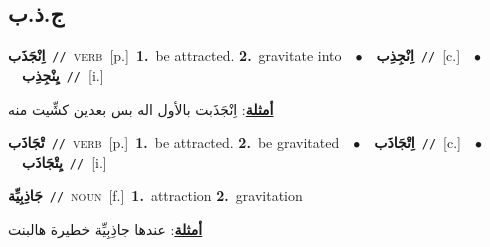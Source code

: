 \documentclass[10pt,a4paper,twoside]{article} %
\begin{document}
\begin{multicols}{2}
\vspace{-3mm}
\subsection*{\color{blue}\foreignlanguage{arabic}{ج.ذ.ب}\color{blue}{}} 

{\setlength\topsep{0pt}\textbf{\foreignlanguage{arabic}{اِنْجَذَب}}\ {\color{gray}\texttt{//}\color{black}}\ \textsc{verb}\ [p.]\ \textbf{1.}~be attracted.  \textbf{2.}~gravitate into\ \ $\bullet$\ \ \setlength\topsep{0pt}\textbf{\foreignlanguage{arabic}{اِنْجِذِب}}\ {\color{gray}\texttt{//}\color{black}}\ [c.]\ \ $\bullet$\ \ \setlength\topsep{0pt}\textbf{\foreignlanguage{arabic}{يِنْجِذِب}}\ {\color{gray}\texttt{//}\color{black}}\ [i.]\  \begin{flushright}\color{gray}\foreignlanguage{arabic}{\textbf{\underline{\foreignlanguage{arabic}{أمثلة}}}: اِنْجَذَبت بالأول اله بس بعدين كشِّيت منه}\end{flushright}\color{black}} \vspace{2mm}

{\setlength\topsep{0pt}\textbf{\foreignlanguage{arabic}{تْجَاذَب}}\ {\color{gray}\texttt{//}\color{black}}\ \textsc{verb}\ [p.]\ \textbf{1.}~be attracted.  \textbf{2.}~be gravitated\ \ $\bullet$\ \ \setlength\topsep{0pt}\textbf{\foreignlanguage{arabic}{اِتْجَاذَب}}\ {\color{gray}\texttt{//}\color{black}}\ [c.]\ \ $\bullet$\ \ \setlength\topsep{0pt}\textbf{\foreignlanguage{arabic}{يِتْجَاذَب}}\ {\color{gray}\texttt{//}\color{black}}\ [i.]\ } \vspace{2mm}

{\setlength\topsep{0pt}\textbf{\foreignlanguage{arabic}{جَاذِبِيِّة}}\ {\color{gray}\texttt{//}\color{black}}\ \textsc{noun}\ [f.]\ \textbf{1.}~attraction  \textbf{2.}~gravitation\  \begin{flushright}\color{gray}\foreignlanguage{arabic}{\textbf{\underline{\foreignlanguage{arabic}{أمثلة}}}: عندها جاذِبِيِّة خطيرة هالبنت}\end{flushright}\color{black}} \vspace{2mm}


\end{multicols}
\end{document}
